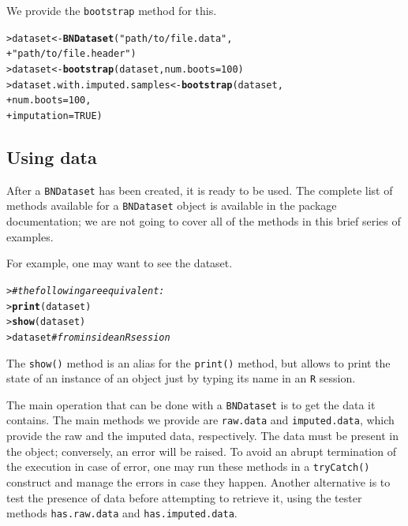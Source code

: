 \documentclass{article}\usepackage[]{graphicx}\usepackage[]{color}
\makeatletter
\newcommand{\hlnum}[1]{\textcolor[rgb]{0.686,0.059,0.569}{#1}}%
\newcommand{\hlstr}[1]{\textcolor[rgb]{0.192,0.494,0.8}{#1}}%
\newcommand{\hlcom}[1]{\textcolor[rgb]{0.678,0.584,0.686}{\textit{#1}}}%
\newcommand{\hlstd}[1]{\textcolor[rgb]{0.345,0.345,0.345}{#1}}%
\newcommand{\hlkwb}[1]{\textcolor[rgb]{0.69,0.353,0.396}{#1}}%
\newcommand{\hlkwc}[1]{\textcolor[rgb]{0.333,0.667,0.333}{#1}}%
\newcommand{\hlkwd}[1]{\textcolor[rgb]{0.737,0.353,0.396}{\textbf{#1}}}%
\newenvironment{kframe}{%
 \def\at@end@of@kframe{}%
 \ifinner\ifhmode%
  \def\at@end@of@kframe{\end{minipage}}%
  \begin{minipage}{\columnwidth}%
 \fi\fi%
 \def\FrameCommand##1{\hskip\@totalleftmargin \hskip-\fboxsep
 \colorbox{shadecolor}{##1}\hskip-\fboxsep
     \hskip-\linewidth \hskip-\@totalleftmargin \hskip\columnwidth}%
 \MakeFramed {\advance\hsize-\width
   \@totalleftmargin\z@ \linewidth\hsize
   \@setminipage}}%
 {\par\unskip\endMakeFramed%
 \at@end@of@kframe}
\newenvironment{knitrout}{}{} %
\newcommand{\Robject}[1]{{\texttt{#1}}}
\newcommand{\Rmethod}[1]{{\texttt{#1}}}
\makeatother
\begin{document}
We provide the \Rmethod{bootstrap} method for this.
\begin{knitrout}
\color{fgcolor}\begin{kframe}
\begin{alltt}
\hlstd{> }\hlstd{dataset} \hlkwb{<-} \hlkwd{BNDataset}\hlstd{(}\hlstr{"path/to/file.data"}\hlstd{,}
\hlstd{+ }                     \hlstr{"path/to/file.header"}\hlstd{)}
\hlstd{> }\hlstd{dataset} \hlkwb{<-} \hlkwd{bootstrap}\hlstd{(dataset,} \hlkwc{num.boots} \hlstd{=} \hlnum{100}\hlstd{)}
\hlstd{> }\hlstd{dataset.with.imputed.samples} \hlkwb{<-} \hlkwd{bootstrap}\hlstd{(dataset,}
\hlstd{+ }                                          \hlkwc{num.boots} \hlstd{=} \hlnum{100}\hlstd{,}
\hlstd{+ }                                          \hlkwc{imputation} \hlstd{=} \hlnum{TRUE}\hlstd{)}
\end{alltt}
\end{kframe}
\end{knitrout}

\subsection{Using data}
\label{sec:usingdata}
After a \Robject{BNDataset} has been created, it is ready to be used.
The complete list of methods available for a \Robject{BNDataset} object is available
in the package documentation; we are not going to cover all of the methods in this brief series
of examples.

For example, one may want to see the dataset.
\begin{knitrout}
\color{fgcolor}\begin{kframe}
\begin{alltt}
\hlstd{> }\hlcom{# the following are equivalent:}
\hlstd{> }\hlkwd{print}\hlstd{(dataset)}
\hlstd{> }\hlkwd{show}\hlstd{(dataset)}
\hlstd{> }\hlstd{dataset} \hlcom{# from inside an R session}
\end{alltt}
\end{kframe}
\end{knitrout}
The \Rmethod{show()} method is an alias for the \Rmethod{print()} method, but allows to print the state of an instance of an object
just by typing its name in an \texttt{R} session.

The main operation that can be done with a \Robject{BNDataset} is to get the data it contains.
The main methods we provide are \Rmethod{raw.data} and \Rmethod{imputed.data}, which provide the raw and the
imputed data, respectively. The data must be present in the object; conversely, an error will be raised.
To avoid an abrupt termination of the execution in case of error, one may run these methods in a
\Rmethod{tryCatch()} construct and manage the errors in case they happen. Another alternative is to test
the presence of data before attempting to retrieve it, using the tester methods \Rmethod{has.raw.data} and
\Rmethod{has.imputed.data}.
\end{document}
